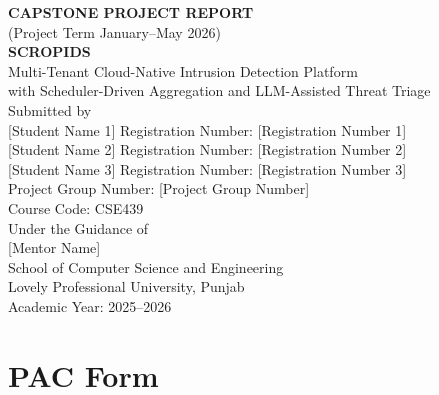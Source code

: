 \documentclass[12pt,a4paper]{article}
\begin{document}
\begin{titlepage}
\begin{center}
\vspace*{1.8cm}
{\Large\textbf{CAPSTONE PROJECT REPORT}}\\[0.3cm]
{\large (Project Term January--May 2026)}\\[1.4cm]
{\Large\textbf{SCROPIDS}}\\[0.5cm]
{\large Multi-Tenant Cloud-Native Intrusion Detection Platform\\
with Scheduler-Driven Aggregation and LLM-Assisted Threat Triage}\\[1.4cm]

{\large Submitted by}\\[0.7cm]

{\large [Student Name 1] \hspace{0.5cm} Registration Number: [Registration Number 1]}\\[0.25cm]
{\large [Student Name 2] \hspace{0.5cm} Registration Number: [Registration Number 2]}\\[0.25cm]
{\large [Student Name 3] \hspace{0.5cm} Registration Number: [Registration Number 3]}\\[1cm]

{\large Project Group Number: [Project Group Number]}\\[0.2cm]
{\large Course Code: CSE439}\\[1.1cm]

{\large Under the Guidance of}\\[0.25cm]
{\large [Mentor Name]}\\[0.2cm]
{\large School of Computer Science and Engineering}\\[0.2cm]
{\large Lovely Professional University, Punjab}\\[0.2cm]
{\large Academic Year: 2025--2026}
\end{center}
\end{titlepage}

\setcounter{page}{2}

\section*{PAC Form}
\begin{center}
\end{center}
\end{document}
